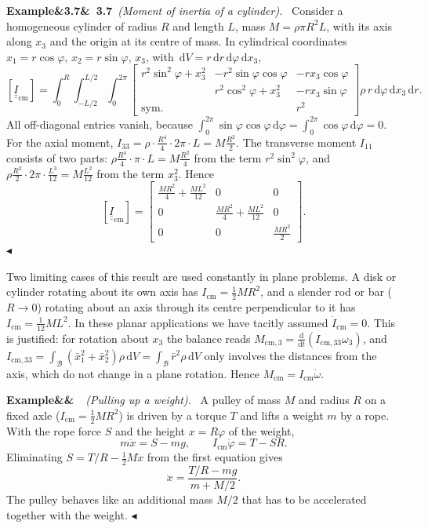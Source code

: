\documentclass[11pt,a4paper,oneside]{report}
\numberwithin{equation}{chapter}
\newcommand{\tens}[1]{\underline{\underline{#1}}}
\newcommand{\dd}{\,\mathrm{d}}
\newcommand{\cm}{\mathrm{cm}}
\theoremstyle{plain}
\theoremstyle{definition}
\theoremstyle{remark}
\newenvironment{example}[2]{%
  \par\addvspace{\bigskipamount}\noindent
  \textbf{Example\ifx&#1&\else~#1\fi}\ \textit{(#2).}\ \ignorespaces}%
  {\hfill$\blacktriangleleft$\par\addvspace{\bigskipamount}}
\begin{document}
\begin{example}{3.7}{Moment of inertia of a cylinder}
Consider a homogeneous cylinder of radius $R$ and length $L$, mass $M=\rho\pi R^2L$, with its axis along $x_3$ and the
origin at its centre of mass. In cylindrical coordinates $x_1=r\cos\varphi$, $x_2=r\sin\varphi$, $x_3$, with
$\dd V=r\dd r\dd\varphi\dd x_3$,
\[
  [\tens I_\cm]=\int_0^R\!\!\int_{-L/2}^{L/2}\!\!\int_0^{2\pi}
  \begin{bmatrix}r^2\sin^2\varphi+x_3^2&-r^2\sin\varphi\cos\varphi&-rx_3\cos\varphi\\
  &r^2\cos^2\varphi+x_3^2&-rx_3\sin\varphi\\ \text{sym.}&&r^2\end{bmatrix}\rho\,r\dd\varphi\dd x_3\dd r .
\]
All off-diagonal entries vanish, because $\int_0^{2\pi}\sin\varphi\cos\varphi\dd\varphi=\int_0^{2\pi}\cos\varphi\dd\varphi=0$.
For the axial moment, $I_{33}=\rho\cdot\frac{R^4}{4}\cdot2\pi\cdot L=M\frac{R^2}{2}$. The transverse moment $I_{11}$ consists
of two parts: $\rho\frac{R^4}{4}\cdot\pi\cdot L=M\frac{R^2}{4}$ from the term $r^2\sin^2\varphi$, and
$\rho\frac{R^2}{2}\cdot2\pi\cdot\frac{L^3}{12}=M\frac{L^2}{12}$ from the term $x_3^2$. Hence
\[
  [\tens I_\cm]=\begin{bmatrix}\frac{MR^2}{4}+\frac{ML^2}{12}&0&0\\0&\frac{MR^2}{4}+\frac{ML^2}{12}&0\\0&0&\frac{MR^2}{2}\end{bmatrix}.
\]
\end{example}

Two limiting cases of this result are used constantly in plane problems. A disk or cylinder rotating about its own
axis has $I_\cm=\frac12MR^2$, and a slender rod or bar ($R\to0$) rotating about an axis through its centre perpendicular
to it has $I_\cm=\frac1{12}ML^2$. In these planar applications we have tacitly assumed $\dot I_\cm=0$. This is justified:
for rotation about $x_3$ the balance reads $M_{\cm,3}=\frac{\mathrm d}{\mathrm dt}(I_{\cm,33}\omega_3)$, and
$I_{\cm,33}=\int_{\mathcal B}(\bar x_1^2+\bar x_2^2)\rho\dd V=\int_{\mathcal B}\bar r^2\rho\dd V$ only involves the distances
from the axis, which do not change in a plane rotation. Hence $M_\cm=I_\cm\dot\omega$.

\begin{example}{}{Pulling up a weight}
A pulley of mass $M$ and radius $R$ on a fixed axle ($I_\cm=\frac12MR^2$) is driven by a torque $T$ and lifts a weight
$m$ by a rope. With the rope force $S$ and the height $x=R\varphi$ of the weight,
\[
  m\ddot x=S-mg,\qquad I_\cm\ddot\varphi=T-SR .
\]
Eliminating $S=T/R-\frac12M\ddot x$ from the first equation gives
\[
  \ddot x=\frac{T/R-mg}{m+M/2}.
\]
The pulley behaves like an additional mass $M/2$ that has to be accelerated together with the weight.
\end{example}
\end{document}
